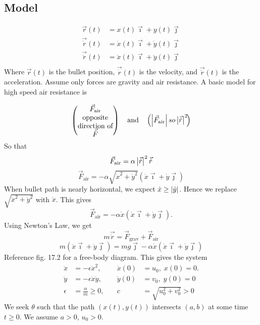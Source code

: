 \documentclass[12pt,twoside]{article}
\begin{document}
\subsection{Model}
\begin{equation*}
  \begin{aligned}
    \vec{r}(t) &= x(t)\vec{\imath} + y(t)\vec{\jmath} \\
    \vec{\dot{r}}(t) &= \dot{x}(t)\vec{\imath} + \dot{y}(t)\vec{\jmath} \\
    \vec{\ddot{r}}(t) &= \ddot{x}(t)\vec{\imath} + \ddot{y}(t)\vec{\jmath} \\
  \end{aligned}
\end{equation*}
Where $\vec{r}(t)$ is the bullet position, $\vec{\dot{r}}(t)$ is the velocity,
and $\vec{\ddot{r}}(t)$ is the acceleration. Assume only forces are gravity and
air resistance. A basic model for high speed air resistance is

\begin{equation}
  \left( \text{\parbox{5em}{\centering $\vec{F}_{\text{air}}$ opposite direction of $\vec{\dot{F}}$}}
  \right) \quad\text{and}\quad
  \left( \parbox{5em}{\centering \text{$\abs{\vec{F}_{\text{air}}} so \abs{\vec{\dot{r}}}^2$}} \right)
\end{equation}
So that
$$\vec{F}_{\text{air}} = \alpha\left|{\vec{\dot{r}}}\right|^2\vec{\dot{r}}$$
$$\vec{F}_{\text{air}} =
-\alpha\sqrt{\dot{x}^2+\dot{y}^2}(\dot{x}\vec{\imath}+\dot{y}\vec{\jmath})$$
When bullet path is nearly horizontal, we expect $\dot{x}\ge\left|{\dot{y}}\right|$.
Hence we replace $\sqrt{\dot{x}^2+\dot{y}^2}$ with $\dot{x}$. This gives
$$\vec{F}_{\text{air}} = -\alpha\dot{x}(\dot{x}\vec{\imath}+\dot{y}\vec{\jmath}).$$
Using Newton's Law, we get
$$m\vec{\ddot{r}} = \vec{F}_{\text{grav}} + \vec{F}_{\text{air}}$$
$$m(\ddot{x}\vec{\imath}+\ddot{y}\vec{\jmath}) = mg\vec{\jmath} -
\alpha\dot{x}(\dot{x}\vec{\imath}+\dot{y}\vec{\jmath})$$
Reference fig. 17.2 for a free-body diagram. This gives the system
\begin{equation}
  \label{eq:ballistic-system}
  \begin{aligned}
    \ddot{x} &= -\epsilon\dot{x}^2,&\quad \dot{x}(0)&=u_0,\;x(0)=0. \\
    \ddot{y} &= -\epsilon\dot{x}\dot{y},&\quad \dot{y}(0)&=v_0,\;y(0)=0 \\
    \epsilon &= \frac{\alpha}{m} \ge 0, &\quad c&=\sqrt{u_0^2+v_0^2}>0
  \end{aligned}
\end{equation}
We seek $\theta$ such that the path $(x(t), y(t))$ intersects $(a,b)$ at some
time $t\ge0$. We assume $a>0$, $u_0>0$.
\end{document}
